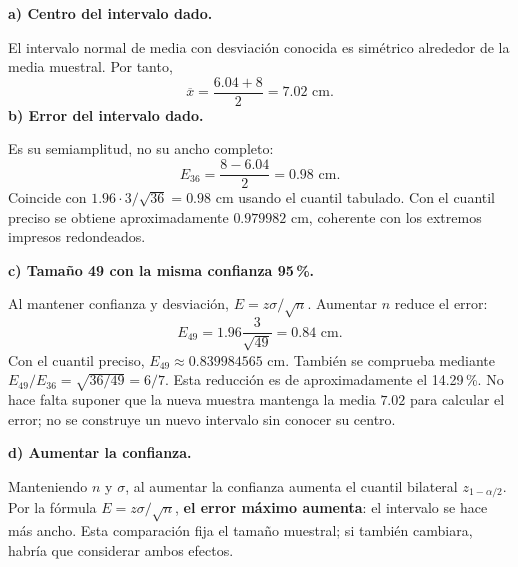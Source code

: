 \textbf{a) Centro del intervalo dado.}\par\nopagebreak[4]
El intervalo normal de media con desviación conocida es simétrico alrededor de la media muestral. Por tanto,
\[
\boxed{\overline x=\frac{6.04+8}{2}=7.02\text{ cm}.}
\]
\textbf{b) Error del intervalo dado.}\par\nopagebreak[4]
Es su semiamplitud, no su ancho completo:
\[
\boxed{E_{36}=\frac{8-6.04}{2}=0.98\text{ cm}.}
\]
Coincide con $1.96\cdot3/\sqrt{36}=0.98$ cm usando el cuantil tabulado. Con el cuantil preciso se obtiene aproximadamente $0.979982$ cm, coherente con los extremos impresos redondeados.

\textbf{c) Tamaño 49 con la misma confianza 95\,\%.}\par\nopagebreak[4]
Al mantener confianza y desviación, $E=z\sigma/\sqrt n$. Aumentar $n$ reduce el error:
\[
E_{49}=1.96\frac3{\sqrt{49}}=\boxed{0.84\text{ cm}}.
\]
Con el cuantil preciso, $E_{49}\approx0.839984565$ cm. También se comprueba mediante $E_{49}/E_{36}=\sqrt{36/49}=6/7$. Esta reducción es de aproximadamente el 14.29\,\%. No hace falta suponer que la nueva muestra mantenga la media $7.02$ para calcular el error; no se construye un nuevo intervalo sin conocer su centro.

\textbf{d) Aumentar la confianza.}\par\nopagebreak[4]
Manteniendo $n$ y $\sigma$, al aumentar la confianza aumenta el cuantil bilateral $z_{1-\alpha/2}$. Por la fórmula $E=z\sigma/\sqrt n$, \textbf{el error máximo aumenta}: el intervalo se hace más ancho. Esta comparación fija el tamaño muestral; si también cambiara, habría que considerar ambos efectos.
